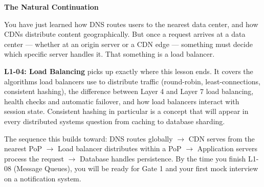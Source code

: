 \documentclass[11pt,a4paper]{article}
\begin{document}
\begin{insightbox}
\textbf{The Natural Continuation}

You have just learned how DNS routes users to the nearest data center, and how CDNs distribute content geographically. But once a request arrives at a data center --- whether at an origin server or a CDN edge --- something must decide which specific server handles it. That something is a load balancer.

\textbf{L1-04: Load Balancing} picks up exactly where this lesson ends. It covers the algorithms load balancers use to distribute traffic (round-robin, least-connections, consistent hashing), the difference between Layer 4 and Layer 7 load balancing, health checks and automatic failover, and how load balancers interact with session state. Consistent hashing in particular is a concept that will appear in every distributed systems question from caching to database sharding.

The sequence this builds toward: DNS routes globally $\to$ CDN serves from the nearest PoP $\to$ Load balancer distributes within a PoP $\to$ Application servers process the request $\to$ Database handles persistence. By the time you finish L1-08 (Message Queues), you will be ready for Gate 1 and your first mock interview on a notification system.
\end{insightbox}
\end{document}
